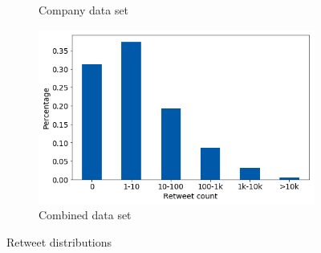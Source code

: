 \begin{figure}[h]
\begin{subfigure}{.45\textwidth}
  \caption{Company data set}
  \label{fig:retw_distr_sub3}
\end{subfigure}%
\begin{subfigure}{.45\textwidth}
  \centering
  \includegraphics[width=.95\linewidth]{img/comb_retw_distr}
  \caption{Combined data set}
  \label{fig:retw_distr_sub4}
\end{subfigure}%
\caption{Retweet distributions}
\label{fig:retw_distr}
\end{figure}

